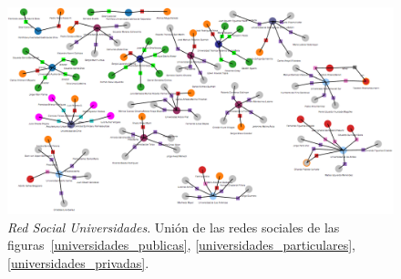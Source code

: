 \begin{figure}[H]
  \centering
  \includegraphics[width=1.0\textwidth]{images/universidades.png}
  \caption[Red Social Universidades]{\emph{Red Social Universidades}. Unión de las redes sociales de las figuras~\ref{universidades_publicas}, \ref{universidades_particulares}, \ref{universidades_privadas}.}
  \label{universidades}
\end{figure}




